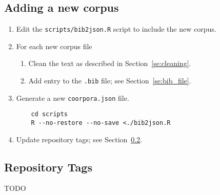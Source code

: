 \documentclass[a4paper,10pt]{paper}
\begin{document}
\subsection{Adding a new corpus}
\begin{enumerate}
    \item Edit the \texttt{scripts/bib2json.R} script to include the new corpus.
    \item For each new corpus file
        \begin{enumerate}
            \item Clean the text as described in Section~\ref{se:cleaning}.
            \item Add entry to the \texttt{.bib} file; see Section~\ref{se:bib_file}. 
        \end{enumerate}
    \item Generate a new \texttt{coorpora.json} file.
        \begin{verbatim}
    cd scripts
    R --no-restore --no-save <./bib2json.R \end{verbatim}
    \item Update repository tags; see Section~\ref{se:tags}.
\end{enumerate}
\subsection{Repository Tags} \label{se:tags}
TODO
\end{document}
